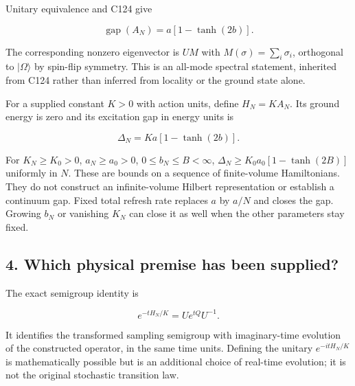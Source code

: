 \documentclass[11pt,a4paper]{article}
\begin{document}
Unitary equivalence and C124 give

\[
\operatorname{gap}(A_N)=a[1-\tanh(2b)].
\]

The corresponding nonzero eigenvector is \(U M\) with
\(M(\sigma)=\sum_i\sigma_i\), orthogonal to \(|\Omega\rangle\) by
spin-flip symmetry. This is an all-mode spectral statement, inherited
from C124 rather than inferred from locality or the ground state alone.

For a supplied constant \(K>0\) with action units, define \(H_N=K A_N\).
Its ground energy is zero and its excitation gap in energy units is

\[
\Delta_N=Ka[1-\tanh(2b)].
\]

For \(K_N\ge K_0>0\), \(a_N\ge a_0>0\), \(0\le b_N\le B<\infty\),
\(\Delta_N\ge K_0a_0[1-\tanh(2B)]\) uniformly in \(N\). These are bounds
on a sequence of finite-volume Hamiltonians. They do not construct an
infinite-volume Hilbert representation or establish a continuum gap.
Fixed total refresh rate replaces \(a\) by \(a/N\) and closes the gap.
Growing \(b_N\) or vanishing \(K_N\) can close it as well when the other
parameters stay fixed.

\hypertarget{which-physical-premise-has-been-supplied}{%
\subsection{4. Which physical premise has been
supplied?}\label{which-physical-premise-has-been-supplied}}

The exact semigroup identity is

\[
 e^{-tH_N/K}=Ue^{tQ}U^{-1}.
\]

It identifies the transformed sampling semigroup with imaginary-time
evolution of the constructed operator, in the same time units. Defining
the unitary \(e^{-itH_N/K}\) is mathematically possible but is an
additional choice of real-time evolution; it is not the original
stochastic transition law.
\end{document}
